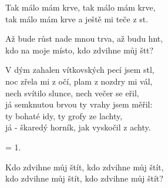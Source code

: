 
\cho{}
Tak málo mám krve, tak málo mám krve,\\
tak málo mám krve a ještě mi teče z st.

\cho{}

\ve{}
Až bude růst nade mnou trva, až budu hnt, \quad {}\\
kdo na moje místo, kdo zdvihne můj štt?

\cho{}

\re{*:}
V dým zahalen vítkovských pecí jsem stl,\\
noc zřela mi z očí, plam z nozdry mi vál,\\
nech svítilo slunce, nech večer se eřil,\\
já semknutou brvou ty vrahy jsem měřil:\\
ty bohaté idy, ty grofy ze lachty,\\
já - škaredý horník, jak vyskočil z achty.

\cho{}

\cho{}

\ve{}
= 1.

\cho{}
Kdo zdvihne můj štít, kdo zdvihne můj štít,\\
kdo zdvihne můj štít, kdo zdvihne můj štít?

\esong{}